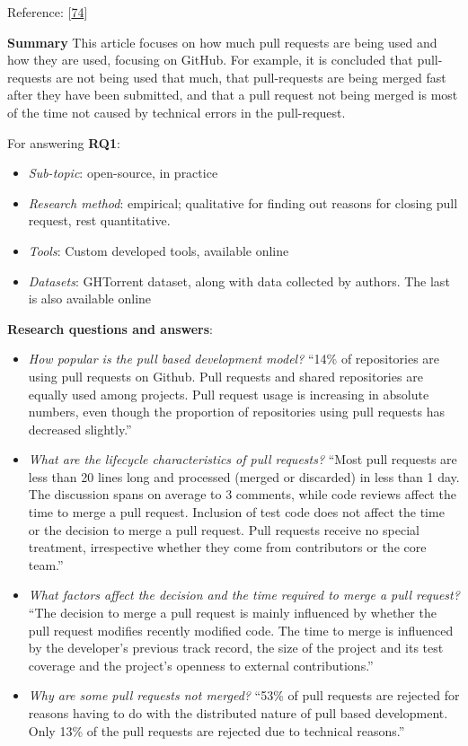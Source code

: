 \documentclass[]{book}
\providecommand{\tightlist}{%
  \setlength{\itemsep}{0pt}\setlength{\parskip}{0pt}}
\begin{document}
Reference: {[}\protect\hyperlink{ref-gousios2014exploratory}{74}{]}

\textbf{Summary} This article focuses on how much pull requests are
being used and how they are used, focusing on GitHub. For example, it is
concluded that pull-requests are not being used that much, that
pull-requests are being merged fast after they have been submitted, and
that a pull request not being merged is most of the time not caused by
technical errors in the pull-request.

For answering \textbf{RQ1}:

\begin{itemize}
\tightlist
\item
  \emph{Sub-topic}: open-source, in practice
\item
  \emph{Research method}: empirical; qualitative for finding out reasons
  for closing pull request, rest quantitative.
\item
  \emph{Tools}: Custom developed tools, available online
\item
  \emph{Datasets}: GHTorrent dataset, along with data collected by
  authors. The last is also available online
\end{itemize}

\textbf{Research questions and answers}:

\begin{itemize}
\tightlist
\item
  \emph{How popular is the pull based development model?} ``14\% of
  repositories are using pull requests on Github. Pull requests and
  shared repositories are equally used among projects. Pull request
  usage is increasing in absolute numbers, even though the proportion of
  repositories using pull requests has decreased slightly.''
\item
  \emph{What are the lifecycle characteristics of pull requests?} ``Most
  pull requests are less than 20 lines long and processed (merged or
  discarded) in less than 1 day. The discussion spans on average to 3
  comments, while code reviews affect the time to merge a pull request.
  Inclusion of test code does not affect the time or the decision to
  merge a pull request. Pull requests receive no special treatment,
  irrespective whether they come from contributors or the core team.''
\item
  \emph{What factors affect the decision and the time required to merge
  a pull request?} ``The decision to merge a pull request is mainly
  influenced by whether the pull request modifies recently modified
  code. The time to merge is influenced by the developer's previous
  track record, the size of the project and its test coverage and the
  project's openness to external contributions.''
\item
  \emph{Why are some pull requests not merged?} ``53\% of pull requests
  are rejected for reasons having to do with the distributed nature of
  pull based development. Only 13\% of the pull requests are rejected
  due to technical reasons.''
\end{itemize}
\end{document}
